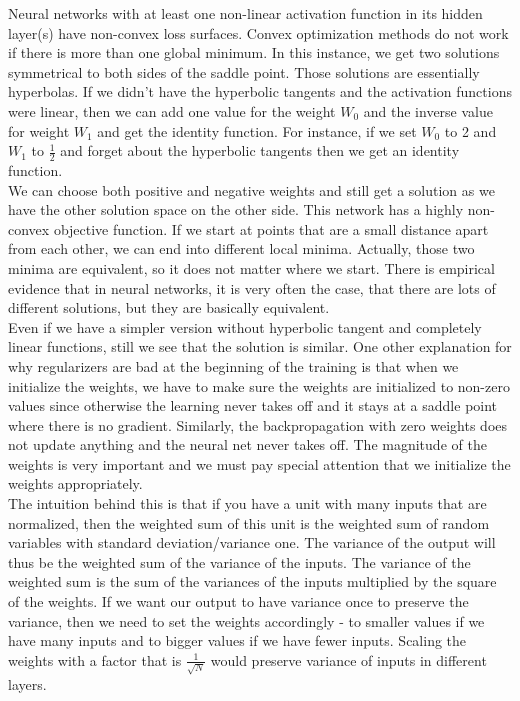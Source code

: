 Neural networks with at least one non-linear activation function in its hidden layer(s) have non-convex loss surfaces. 
Convex optimization methods do not work if there is more than one global minimum. 
In this instance, we get two solutions symmetrical to both sides of the saddle point. 
Those solutions are essentially hyperbolas. If we didn't have the hyperbolic tangents and the activation functions were linear, then we can add one value for the weight $W_0$ and the inverse value for weight $W_1$ and get the identity function. 
For instance, if we set $W_0$ to 2 and $W_1$ to $\frac{1}{2}$ and forget about the hyperbolic tangents then we get an identity function.\\

We can choose both positive and negative weights and still get a solution as we have the other solution space on the other side. 
This network has a highly non-convex objective function. If we start at points that are a small distance apart from each other, we can end into different local minima. 
Actually, those two minima are equivalent, so it does not matter where we start. 
There is empirical evidence that in neural networks, it is very often the case, that there are lots of different solutions, but they are basically equivalent. \\

Even if we have a simpler version without hyperbolic tangent and completely linear functions, still we see that the solution is similar. 
One other explanation for why regularizers are bad at the beginning of the training is that when we initialize the weights, we have to make sure the weights are initialized to non-zero values since otherwise the learning never takes off and it stays at a saddle point where there is no gradient.
Similarly, the backpropagation with zero weights does not update anything and the neural net never takes off. 
The magnitude of the weights is very important and we must pay special attention that we initialize the weights appropriately.\\

The intuition behind this is that if you have a unit with many inputs that are normalized, then the weighted sum of this unit is the weighted sum of random variables with standard deviation/variance one.
The variance of the output will thus be the weighted sum of the variance of the inputs. 
The variance of the weighted sum is the sum of the variances of the inputs multiplied by the square of the weights. 
If we want our output to have variance once to preserve the variance, then we need to set the weights accordingly - to smaller values if we have many inputs and to bigger values if we have fewer inputs.
Scaling the weights with a factor that is $\frac{1}{\sqrt{N}}$ would preserve variance of inputs in different layers. 
